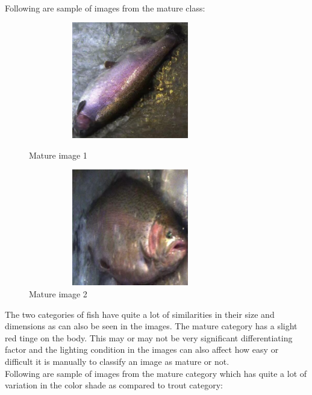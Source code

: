 \\  Following are sample of images from the mature class:

\begin{figure}[H]
  \centering
  \begin{minipage}[b]{0.4\textwidth}
    \centering
    \includegraphics[width=3.5in, height=2in, keepaspectratio]{Figures/mature1.jpg}
    \caption{Mature image 1}
    \label{fig:mature1}
  \end{minipage}
  \hfill
  \begin{minipage}[b]{0.4\textwidth}
    \centering
    \includegraphics[width=3.5in, height=2in, keepaspectratio]{Figures/mature2.jpg}
    \caption{Mature image 2}
    \label{fig:mature2}
  \end{minipage}
\end{figure}

The two categories of fish have quite a lot of similarities in their size and dimensions as can also be seen in the images. The mature category has a slight red tinge on the body. This may or may not be very significant differentiating factor and the lighting condition in the images can also affect how easy or difficult it is manually to classify an image as mature or not. \\ 

Following are sample of images from the mature category which has quite a lot of variation in the color shade as compared to trout category:

